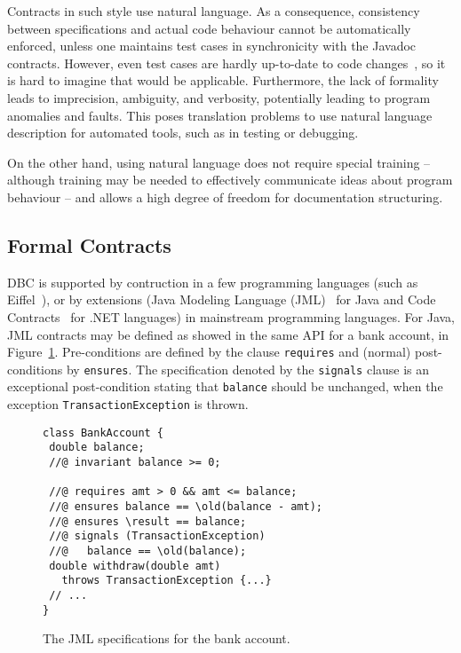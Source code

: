 Contracts in such style use natural language. As a consequence, consistency between specifications and actual code behaviour cannot be automatically enforced, unless one maintains test cases in synchronicity with the Javadoc contracts. However, even test cases are hardly up-to-date to code changes~\cite{}, so it is hard to imagine that would be applicable. 
Furthermore, the lack of formality leads to imprecision, ambiguity, and verbosity, potentially leading to program anomalies and faults.
This poses translation problems to use natural language description for automated tools, such as in testing or debugging.

On the other hand, using natural language does not require special training -- although training may be needed to effectively communicate
ideas about program behaviour -- and allows a high degree of freedom for documentation structuring. 


\subsection{Formal Contracts}


DBC is supported by contruction in a few programming languages (such as Eiffel~\cite{}), or by extensions (Java Modeling Language (JML)~\cite{} for Java and Code Contracts~\cite{} for .NET languages) in mainstream programming languages.
For Java, JML contracts may be defined as showed in the same API for a bank account, in Figure~\ref{Fig-JML-Bank}. Pre-conditions
are defined by the clause {\lstinline!requires!} and (normal) post-conditions by {\lstinline!ensures!}. The specification
denoted by the {\lstinline!signals!} clause
is an exceptional post-condition stating that {\lstinline!balance!} should be unchanged, when the exception \texttt{TransactionExcep\-tion} is thrown.

\begin{figure}
\begin{lstlisting}[basicstyle=\footnotesize\ttfamily,name=figxpi]
class BankAccount {
 double balance;
 //@ invariant balance >= 0;

 //@ requires amt > 0 && amt <= balance;
 //@ ensures balance == \old(balance - amt);
 //@ ensures \result == balance;
 //@ signals (TransactionException) 
 //@   balance == \old(balance);
 double withdraw(double amt) 
   throws TransactionException {...}
 // ...
}
\end{lstlisting}
\caption{The JML specifications for the bank account.}
\label{Fig-JML-Bank}
\end{figure}

